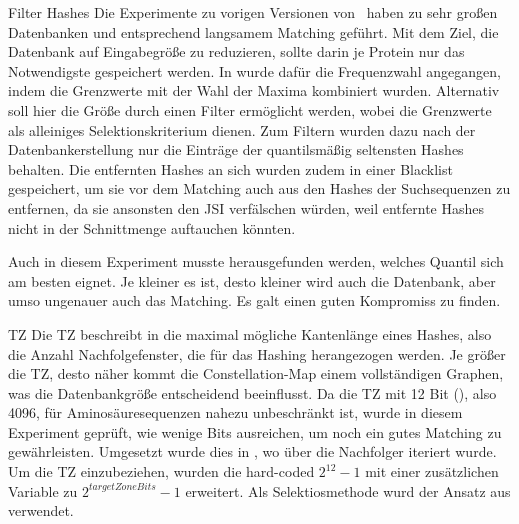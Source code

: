     \begin{experiment}{Filter Hashes} %
        \label{exp:filter_hashes}
        Die Experimente zu vorigen Versionen von \protfin\ haben zu sehr großen Datenbanken und entsprechend langsamem Matching geführt. Mit dem Ziel, die Datenbank auf Eingabegröße zu reduzieren, sollte darin je Protein nur das Notwendigste gespeichert werden. In  wurde dafür die Frequenzwahl angegangen, indem die Grenzwerte mit der Wahl der Maxima kombiniert wurden. Alternativ soll hier die Größe durch einen Filter ermöglicht werden, wobei die Grenzwerte als alleiniges Selektionskriterium dienen. Zum Filtern wurden dazu nach der Datenbankerstellung nur die Einträge der quantilsmäßig seltensten Hashes behalten. Die entfernten Hashes an sich wurden zudem in einer Blacklist gespeichert, um sie vor dem Matching auch aus den Hashes der Suchsequenzen zu entfernen, da sie ansonsten den \ac{JSI} verfälschen würden, weil entfernte Hashes nicht in der Schnittmenge auftauchen könnten.

        Auch in diesem Experiment musste herausgefunden werden, welches Quantil sich am besten eignet. Je kleiner es ist, desto kleiner wird auch die Datenbank, aber umso ungenauer auch das Matching. Es galt einen guten Kompromiss zu finden.
    \end{experiment}
    \begin{experiment}{\acl{TZ}} %
        \label{exp:target_zone}
        Die \ac{TZ} beschreibt in  die maximal mögliche Kantenlänge eines Hashes, also die Anzahl Nachfolgefenster, die für das Hashing herangezogen werden. Je größer die \ac{TZ}, desto näher kommt die Constellation-Map einem vollständigen Graphen, was die Datenbankgröße entscheidend beeinflusst. Da die \ac{TZ} mit 12 Bit (), also 4096, für Aminosäuresequenzen nahezu unbeschränkt ist, wurde in diesem Experiment geprüft, wie wenige Bits ausreichen, um noch ein gutes Matching zu gewährleisten. Umgesetzt wurde dies in , wo über die Nachfolger iteriert wurde. Um die \ac{TZ} einzubeziehen, wurden die hard-coded $2^{12} - 1$ mit einer zusätzlichen Variable zu $2^{targetZoneBits} - 1$ erweitert. Als Selektiosmethode wurd der Ansatz aus  verwendet.
    \end{experiment}
